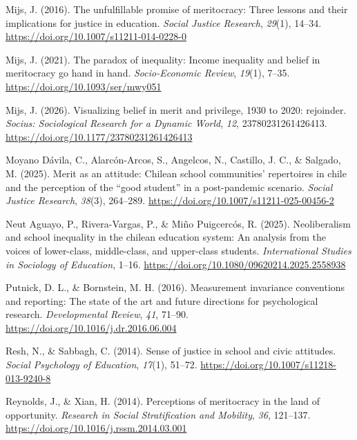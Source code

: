 \documentclass[
  11pt,
]{article}
\newlength{\cslhangindent}
\newenvironment{CSLReferences}[2] %
 {\begin{list}{}{%
  \setlength{\itemindent}{0pt}
  \setlength{\leftmargin}{0pt}
  \setlength{\parsep}{0pt}
  \ifodd #1
   \setlength{\leftmargin}{\cslhangindent}
   \setlength{\itemindent}{-1\cslhangindent}
  \fi
  \setlength{\itemsep}{#2\baselineskip}}}
 {\end{list}}
\begin{document}
\begin{CSLReferences}{1}{0}
Mijs, J. (2016). The unfulfillable promise of meritocracy: Three lessons
and their implications for justice in education. \emph{Social Justice
Research}, \emph{29}(1), 14--34.
\url{https://doi.org/10.1007/s11211-014-0228-0}

Mijs, J. (2021). The paradox of inequality: Income inequality and belief
in meritocracy go hand in hand. \emph{Socio-Economic Review},
\emph{19}(1), 7--35. \url{https://doi.org/10.1093/ser/mwy051}

Mijs, J. (2026). Visualizing belief in merit and privilege, 1930 to
2020: rejoinder. \emph{Socius: Sociological Research for a Dynamic
World}, \emph{12}, 23780231261426413.
\url{https://doi.org/10.1177/23780231261426413}

Moyano Dávila, C., Alarcón-Arcos, S., Angelcos, N., Castillo, J. C., \&
Salgado, M. (2025). Merit as an attitude: Chilean school communities'
repertoires in chile and the perception of the {``good student''} in a
post-pandemic scenario. \emph{Social Justice Research}, \emph{38}(3),
264--289. \url{https://doi.org/10.1007/s11211-025-00456-2}

Neut Aguayo, P., Rivera-Vargas, P., \& Miño Puigcercós, R. (2025).
Neoliberalism and school inequality in the chilean education system: An
analysis from the voices of lower-class, middle-class, and upper-class
students. \emph{International Studies in Sociology of Education}, 1--16.
\url{https://doi.org/10.1080/09620214.2025.2558938}

Putnick, D. L., \& Bornstein, M. H. (2016). Measurement invariance
conventions and reporting: The state of the art and future directions
for psychological research. \emph{Developmental Review}, \emph{41},
71--90. \url{https://doi.org/10.1016/j.dr.2016.06.004}

Resh, N., \& Sabbagh, C. (2014). Sense of justice in school and civic
attitudes. \emph{Social Psychology of Education}, \emph{17}(1), 51--72.
\url{https://doi.org/10.1007/s11218-013-9240-8}

Reynolds, J., \& Xian, H. (2014). Perceptions of meritocracy in the land
of opportunity. \emph{Research in Social Stratification and Mobility},
\emph{36}, 121--137. \url{https://doi.org/10.1016/j.rssm.2014.03.001}


\end{CSLReferences}
\end{document}
